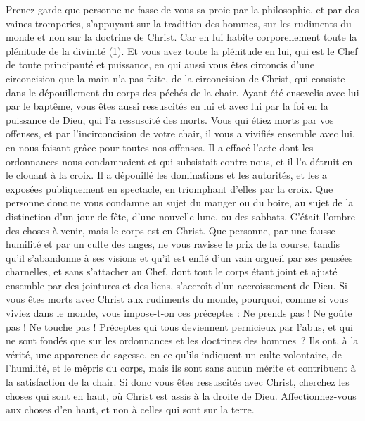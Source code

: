 \begin{multicols}{2}
Prenez garde que personne ne fasse de vous sa proie par la philosophie, et par des vaines tromperies, s’appuyant sur la tradition des hommes, sur les rudiments du monde et non sur la doctrine de Christ.
Car en lui habite corporellement toute la plénitude de la divinité (1).
Et vous avez toute la plénitude en lui, qui est le Chef de toute principauté et puissance,
en qui aussi vous êtes circoncis d'une circoncision que la main n’a pas faite, de la circoncision de Christ, qui consiste dans le dépouillement du corps des péchés de la chair.
Ayant été ensevelis avec lui par le baptême, vous êtes aussi ressuscités en lui et avec lui par la foi en la puissance de Dieu, qui l'a ressuscité des morts.
Vous qui étiez morts par vos offenses, et par l’incirconcision de votre chair, il vous a vivifiés ensemble avec lui, en nous faisant grâce pour toutes nos offenses.
Il a effacé l’acte dont les ordonnances nous condamnaient et qui subsistait contre nous, et il l’a détruit en le clouant à la croix.
Il a dépouillé les dominations et les autorités, et les a exposées publiquement en spectacle, en triomphant d’elles par la croix.
Que personne donc ne vous condamne au sujet du manger ou du boire, au sujet de la distinction d'un jour de fête, d’une nouvelle lune, ou des sabbats.
C’était l’ombre des choses à venir, mais le corps est en Christ.
Que personne, par une fausse humilité et par un culte des anges, ne vous ravisse le prix de la course, tandis qu’il s’abandonne à ses visions et qu’il est enflé d’un vain orgueil par ses pensées charnelles,
et sans s’attacher au Chef, dont tout le corps étant joint et ajusté ensemble par des jointures et des liens, s’accroît d'un accroissement de Dieu.
Si vous êtes morts avec Christ aux rudiments du monde, pourquoi, comme si vous viviez dans le monde, vous impose-t-on ces préceptes :
Ne prends pas ! Ne goûte pas ! Ne touche pas !
Préceptes qui tous deviennent pernicieux par l’abus, et qui ne sont fondés que sur les ordonnances et les doctrines des hommes ?
Ils ont, à la vérité, une apparence de sagesse, en ce qu’ils indiquent un culte volontaire, de l’humilité, et le mépris du corps, mais ils sont sans aucun mérite et contribuent à la satisfaction de la chair.
\VerseOne{}Si donc vous êtes ressuscités avec Christ, cherchez les choses qui sont en haut, où Christ est assis à la droite de Dieu.
Affectionnez-vous aux choses d’en haut, et non à celles qui sont sur la terre.

\end{multicols}
